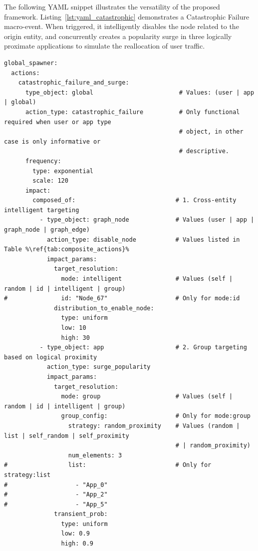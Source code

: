 \documentclass[ASNA]{USG} %
\begin{document}
The following YAML snippet illustrates the versatility of the proposed framework. Listing~\ref{lst:yaml_catastrophic} demonstrates a Catastrophic Failure macro-event. When triggered, it intelligently disables the node related to the origin entity, and concurrently creates a popularity surge in three logically proximate applications to simulate the reallocation of user traffic.


\begin{lstlisting}[escapechar=\%,caption={YAML configuration of a catastrophic failure encapsulated event},label=lst:yaml_catastrophic, basicstyle=\fontsize{8}{10}\selectfont\ttfamily]
global_spawner:
  actions:
    catastrophic_failure_and_surge:
      type_object: global                        # Values: (user | app | global)
      action_type: catastrophic_failure          # Only functional required when user or app type 
                                                 # object, in other case is only informative or 
                                                 # descriptive.
      frequency:
        type: exponential
        scale: 120
      impact:
        composed_of:                            # 1. Cross-entity intelligent targeting
          - type_object: graph_node             # Values (user | app | graph_node | graph_edge)
            action_type: disable_node           # Values listed in Table %\ref{tab:composite_actions}%
            impact_params:
              target_resolution:
                mode: intelligent               # Values (self | random | id | intelligent | group)
#               id: "Node_67"                   # Only for mode:id
              distribution_to_enable_node: 
                type: uniform
                low: 10
                high: 30
          - type_object: app                    # 2. Group targeting based on logical proximity
            action_type: surge_popularity
            impact_params:
              target_resolution:
                mode: group                     # Values (self | random | id | intelligent | group)
                group_config:                   # Only for mode:group
                  strategy: random_proximity    # Values (random | list | self_random | self_proximity
                                                # | random_proximity) 
                  num_elements: 3
#                 list:                         # Only for strategy:list
#                   - "App_0"
#                   - "App_2"
#                   - "App_5"
              transient_prob: 
                type: uniform
                low: 0.9
                high: 0.9
\end{lstlisting}
\end{document}
